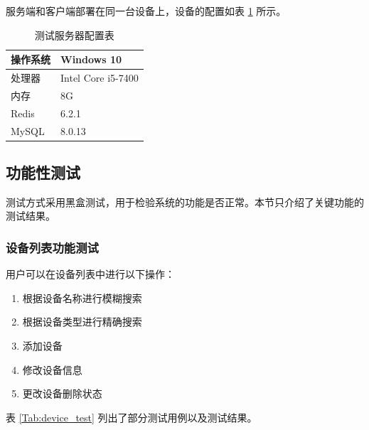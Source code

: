 服务端和客户端部署在同一台设备上，设备的配置如表 \ref{Tab:conf} 所示。

\begin{longtable}[ht]{|l|l|}
\caption{测试服务器配置表}
\label{Tab:conf}\\
\hline
操作系统&Windows 10\\
\hline
处理器&Intel Core i5-7400\\
\hline
内存&8G\\
\hline
Redis&6.2.1 \\
\hline
MySQL&8.0.13\\
\hline
\end{longtable}

\subsection{功能性测试}
测试方式采用黑盒测试，用于检验系统的功能是否正常。本节只介绍了关键功能的测试结果。

\newpage
\subsubsection{设备列表功能测试}
用户可以在设备列表中进行以下操作：
\begin{enumerate}
    \item 根据设备名称进行模糊搜索
    \item 根据设备类型进行精确搜索
    \item 添加设备
    \item 修改设备信息
    \item 更改设备删除状态
\end{enumerate}

表 \ref{Tab:device_test} 列出了部分测试用例以及测试结果。

